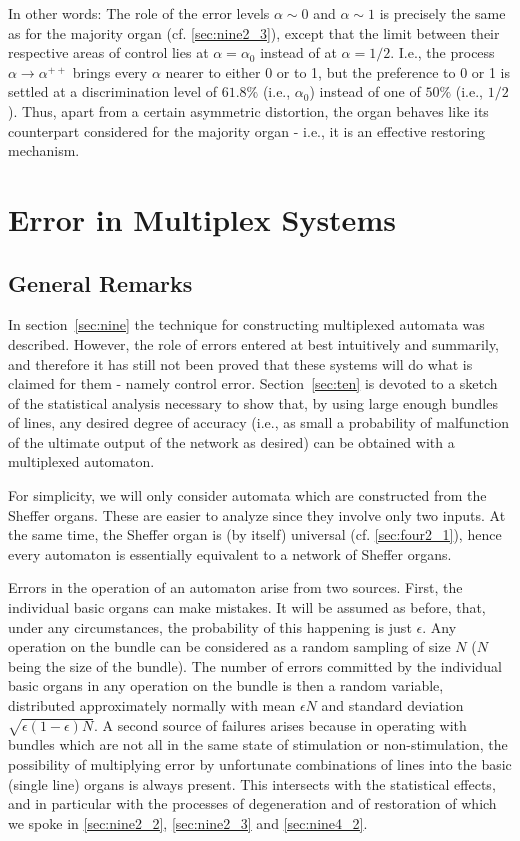 \documentclass[twocolumn,preprintnumbers,amsmath,amssymb,floatfix]{revtex4}
\begin{document}
In other words: The role of the error levels $\alpha\sim0$ and
$\alpha\sim1$ is precisely the same as for the majority organ (cf.
\ref{sec:nine2_3}), except that the limit between their respective
areas of control lies at $\alpha=\alpha_0$ instead of at
$\alpha=1/2$. I.e., the process $\alpha\rightarrow\alpha^{++}$
brings every $\alpha$ nearer to either 0 or to 1, but the
preference to 0 or 1 is settled at a discrimination level of
$61.8\%$ (i.e., $\alpha_0$) instead of one of $50\%$ (i.e.,
$1/2$). Thus, apart from a certain asymmetric distortion, the
organ behaves like its counterpart considered for the majority
organ - i.e., it is an effective restoring mechanism.

\section{\label{sec:ten}Error in Multiplex Systems}

\subsection{\label{sec:ten1}General Remarks}

In section~\ref{sec:nine} the technique for constructing
multiplexed automata was described. However, the role of errors
entered at best intuitively and summarily, and therefore it has
still not been proved that these systems will do what is claimed
for them - namely control error. Section~\ref{sec:ten} is devoted
to a sketch of the statistical analysis necessary to show that, by
using large enough bundles of lines, any desired degree of
accuracy (i.e., as small a probability of malfunction of the
ultimate output of the network as desired) can be obtained with a
multiplexed automaton.

For simplicity, we will only consider automata which are
constructed from the Sheffer organs. These are easier to analyze
since they involve only two inputs. At the same time, the Sheffer
organ is (by itself) universal (cf. \ref{sec:four2_1}), hence
every automaton is essentially equivalent to a network of Sheffer
organs.

Errors in the operation of an automaton arise from two sources.
First, the individual basic organs can make mistakes. It will be
assumed as before, that, under any circumstances, the probability
of this happening is just $\epsilon$. Any operation on the bundle
can be considered as a random sampling of size $N$ ($N$ being the
size of the bundle). The number of errors committed by the
individual basic organs in any operation on the bundle is then a
random variable, distributed approximately normally with mean
$\epsilon N$ and standard deviation
$\sqrt{\epsilon(1-\epsilon)N}$. A second source of failures arises
because in operating with bundles which are not all in the same
state of stimulation or non-stimulation, the possibility of
multiplying error by unfortunate combinations of lines into the
basic (single line) organs is always present. This intersects with
the statistical effects, and in particular with the processes of
degeneration and of restoration of which we spoke in
\ref{sec:nine2_2}, \ref{sec:nine2_3} and \ref{sec:nine4_2}.
\end{document}
